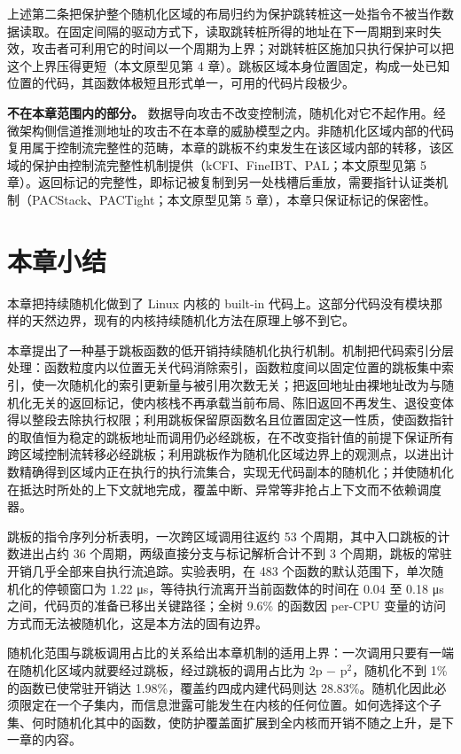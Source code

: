 上述第二条把保护整个随机化区域的布局归约为保护跳转桩这一处指令不被当作数据读取。在固定间隔的驱动方式下，读取跳转桩所得的地址在下一周期到来时失效，攻击者可利用它的时间以一个周期为上界；对跳转桩区施加只执行保护可以把这个上界压得更短（本文原型见第 4 章）。跳板区域本身位置固定，构成一处已知位置的代码，其函数体极短且形式单一，可用的代码片段极少。

\textbf{不在本章范围内的部分。} 数据导向攻击不改变控制流，随机化对它不起作用。经微架构侧信道推测地址的攻击不在本章的威胁模型之内。非随机化区域内部的代码复用属于控制流完整性的范畴，本章的跳板不约束发生在该区域内部的转移，该区域的保护由控制流完整性机制提供（kCFI\citep{clang2022kcfi}、FineIBT\citep{gaidis2023fineibt}、PAL\citep{yoo2022pal}；本文原型见第 5 章）。返回标记的完整性，即标记被复制到另一处栈槽后重放，需要指针认证类机制（PACStack、PACTight；本文原型见第 5 章），本章只保证标记的保密性。

\section{本章小结}

本章把持续随机化做到了 Linux 内核的 built-in 代码上。这部分代码没有模块那样的天然边界，现有的内核持续随机化方法在原理上够不到它。

本章提出了一种基于跳板函数的低开销持续随机化执行机制。机制把代码索引分层处理：函数粒度内以位置无关代码消除索引，函数粒度间以固定位置的跳板集中索引，使一次随机化的索引更新量与被引用次数无关；把返回地址由裸地址改为与随机化无关的返回标记，使内核栈不再承载当前布局、陈旧返回不再发生、退役变体得以整段去除执行权限；利用跳板保留原函数名且位置固定这一性质，使函数指针的取值恒为稳定的跳板地址而调用仍必经跳板，在不改变指针值的前提下保证所有跨区域控制流转移必经跳板；利用跳板作为随机化区域边界上的观测点，以进出计数精确得到区域内正在执行的执行流集合，实现无代码副本的随机化；并使随机化在抵达时所处的上下文就地完成，覆盖中断、异常等非抢占上下文而不依赖调度器。

跳板的指令序列分析表明，一次跨区域调用往返约 53 个周期，其中入口跳板的计数进出占约 36 个周期，两级直接分支与标记解析合计不到 3 个周期，跳板的常驻开销几乎全部来自执行流追踪。实验表明，在 483 个函数的默认范围下，单次随机化的停顿窗口为 1.22 μs，等待执行流离开当前函数体的时间在 0.04 至 0.18 μs 之间，代码页的准备已移出关键路径；全树 9.6\% 的函数因 per-CPU 变量的访问方式而无法被随机化，这是本方法的固有边界。

随机化范围与跳板调用占比的关系给出本章机制的适用上界：一次调用只要有一端在随机化区域内就要经过跳板，经过跳板的调用占比为 2p − p$^{2}$，随机化不到 1\% 的函数已使常驻开销达 1.98\%，覆盖约四成内建代码则达 28.83\%。随机化因此必须限定在一个子集内，而信息泄露可能发生在内核的任何位置。如何选择这个子集、何时随机化其中的函数，使防护覆盖面扩展到全内核而开销不随之上升，是下一章的内容。

